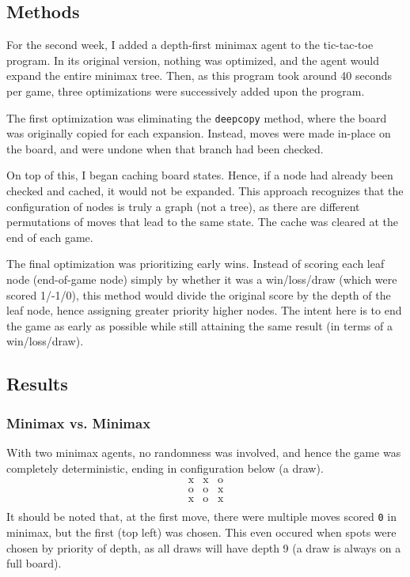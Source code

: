 \subsection{Methods}
For the second week, I added a depth-first minimax agent to the tic-tac-toe program. In its original version, nothing was optimized, and the agent would expand the entire minimax tree. Then, as this program took around 40 seconds per game, three optimizations were successively added upon the program.

The first optimization was eliminating the \texttt{deepcopy} method, where the board was originally copied for each expansion. Instead, moves were made in-place on the board, and were undone when that branch had been checked.

On top of this, I began caching board states. Hence, if a node had already been checked and cached, it would not be expanded. This approach recognizes that the configuration of nodes is truly a graph (not a tree), as there are different permutations of moves that lead to the same state. The cache was cleared at the end of each game.

The final optimization was prioritizing early wins. Instead of scoring each leaf node (end-of-game node) simply by whether it was a win/loss/draw (which were scored 1/-1/0), this method would divide the original score by the depth of the leaf node, hence assigning greater priority higher nodes. The intent here is to end the game as early as possible while still attaining the same result (in terms of a win/loss/draw).

\subsection{Results}

\subsubsection{Minimax vs. Minimax}
With two minimax agents, no randomness was involved, and hence the game was completely deterministic, ending in configuration below (a draw).
\[
    \begin{array}{c|c|c}
        \text{x} & \text{x} & \text{o}\\
        \hline
        \text{o} & \text{o} & \text{x}\\
        \hline
        \text{x} & \text{o} & \text{x}\\
    \end{array}    
\]
It should be noted that, at the first move, there were multiple moves scored \texttt{0} in minimax, but the first (top left) was chosen. This even occured when spots were chosen by priority of depth, as all draws will have depth 9 (a draw is always on a full board).

